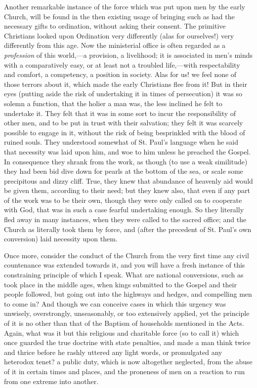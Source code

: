 Another remarkable instance of the force which was put upon men by
the early Church, will be found in the then existing usage of bringing
such as had the necessary gifts to ordination, without asking their
consent. The primitive Christians looked upon Ordination very
differently (alas for ourselves!) very differently from this age. Now
the ministerial office is often regarded as a \emph{profession} of
this world,—a provision, a livelihood; it is associated in men's
minds with a comparatively easy, or at least not a troubled life,—with
respectability and comfort, a competency, a position in society. Alas
for us! we feel none of those terrors about it, which made the early
Christians flee from it! But in their eyes (putting aside the risk of
undertaking it in times of persecution) it was so solemn a function,
that the holier a man was, the less inclined he felt to undertake it.
They felt that it was in some sort to incur the responsibility of
other men, and to be put in trust with their salvation; they felt it
was scarcely possible to engage in it, without the risk of being
besprinkled with the blood of ruined souls. They understood somewhat
of St. Paul's language when he said that necessity was laid upon him,
and woe to him unless he preached the Gospel. In consequence they
shrank from the work, as though (to use a weak similitude) they had
been bid dive down for pearls at the bottom of the sea, or scale some
precipitous and dizzy cliff. True, they knew that abundance of
heavenly aid would be given them, according to their need; but they
knew also, that even if any part of the work was to be their own,
though they were only called on to cooperate with God, that was in
such a case fearful undertaking enough. So they literally fled away in
many instances, when they were called to the sacred office; and the
Church as literally took them by force, and (after the precedent of
St. Paul's own conversion) laid necessity upon them.

Once more, consider the conduct of the Church from the very first
time any civil countenance was extended towards it, and you will have
a fresh instance of this constraining principle of which I speak. What
are national conversions, such as took place in the middle ages, when
kings submitted to the Gospel and their people followed, but going out
into the highways and hedges, and compelling men to come in? And
though we can conceive cases in which this urgency was unwisely,
overstrongly, unseasonably, or too extensively applied, yet the
principle of it is no other than that of the Baptism of households
mentioned in the Acts. Again, what was it but this religious and
charitable force (so to call it) which once guarded the true doctrine
with state penalties, and made a man think twice and thrice before he
rashly uttered any light words, or promulgated any heterodox tenet? a
public duty, which is now altogether neglected, from the abuse of it
in certain times and places, and the proneness of men on a reaction to
run from one extreme into another.

